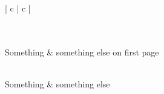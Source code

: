 \documentclass[12pt, a4paper]{article}
\begin{document}
\kant[7]

\begin{longtable}[c]{| c | c |}
 \caption{Long table caption.\label{tab:long}}\\

 \hline
 \\
 \hline
 Something & something else on first page\\
 \hline
 \endfirsthead

 \hline
 \\
 \hline
 Something & something else\\
 \hline
 \endhead

 \hline
 \endfoot

 \hline
 \\
 \hline\hline
 \endlastfoot


\end{longtable}
\end{document}
